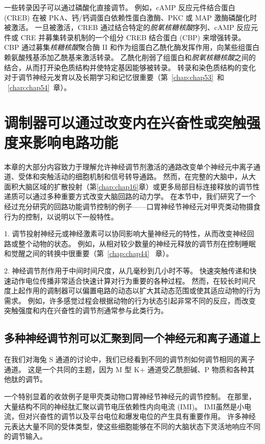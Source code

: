 一些转录因子可以通过磷酸化直接调节。
例如，cAMP 反应元件结合蛋白 (CREB) 在被 PKA、钙/钙调蛋白依赖性蛋白激酶、PKC 或 MAP 激酶磷酸化时被激活。
一旦被激活，CREB 通过结合特定的\textit{脱氧核糖核酸}序列、cAMP 反应元件或 CRE 并募集转录机制的一个组分 CREB 结合蛋白 (CBP) 来增强转录。
CBP 通过募集\textit{核糖核酸}聚合酶 II 和作为组蛋白乙酰化酶发挥作用，向某些组蛋白赖氨酸残基添加乙酰基来激活转录。
乙酰化削弱了组蛋白和\textit{脱氧核糖核酸}之间的结合，从而打开染色质结构并使特定基因能够被转录。
转录和染色质结构的变化对于调节神经元发育以及长期学习和记忆很重要（第~\ref{chap:chap53}~和 ~\ref{chap:chap54}~章）。



\section{调制器可以通过改变内在兴奋性或突触强度来影响电路功能}

本章的大部分内容致力于理解允许神经调节剂激活的通路改变单个神经元中离子通道、受体和突触活动的细胞机制和信号转导通路。
然而，在完整的大脑中，从大面积大脑区域的扩散投射（第\ref{chap:chap16}章）或更多局部目标连接释放的调节性递质可以通过多种重要方式改变大脑回路的动力学。
在本节中，我们研究了一个经过充分研究的回路功能调节控制的例子——口胃神经节神经元对甲壳类动物摄食行为的控制，以说明以下一般特性。


1. 调节投射神经元或神经激素可以协同影响大量神经元的特性，从而改变神经回路或整个动物的状态。
例如，从相对较少数量的神经元释放的调节剂在控制睡眠和觉醒之间的转换中很重要（第~\ref{chap:chap44} ~章）。 


2. 神经调节剂作用于中间时间尺度，从几毫秒到几小时不等。
快速突触传递和快速动作电位传播非常适合快速计算对行为重要的各种过程。
然而，在较长时间尺度上起作用的调制器可以偏置电路的动态以扩大其动态范围或使其适应动物的行为需求。
例如，许多感觉过程会根据动物的行为状态引起非常不同的反应，而改变突触强度和内在兴奋性的调节剂通常参与此类行为。



\subsection{多种神经调节剂可以汇聚到同一个神经元和离子通道上}

在我们对海兔 S 通道的讨论中，我们已经看到不同的调节剂如何调节相同的离子通道。
这是一个共同的主题，因为 M 型 K+ 通道受乙酰胆碱、P 物质和各种其他肽的调节。


一个特别显着的收敛例子是甲壳类动物口胃神经节神经元的调节控制。
在那里，大量结构不同的神经肽汇聚以调节电压依赖性内向电流 (IMI)。
IMI虽然是小电流，但对兴奋性的调节以及平台电位和爆发电位的产生具有重要作用。
许多神经元表达大量不同的受体类型，使这些细胞能够在不同的大脑状态下灵活地响应不同的调节输入。


